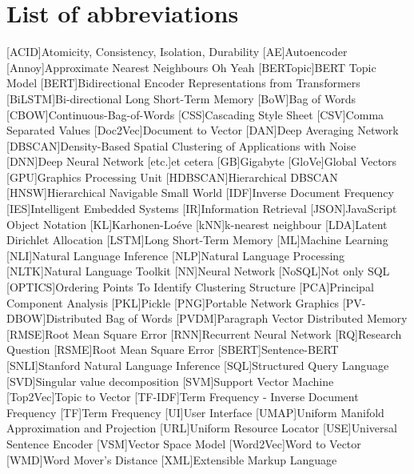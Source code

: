 \chapter*{List of abbreviations}

\begin{acronym}[XXXXXXXXX]
    [ACID]{Atomicity, Consistency, Isolation, Durability}
    [AE]{Autoencoder}
    [Annoy]{Approximate Nearest Neighbours Oh Yeah}
    [BERTopic]{BERT Topic Model}
    [BERT]{Bidirectional Encoder Representations from Transformers}
    [BiLSTM]{Bi-directional Long Short-Term Memory}
    [BoW]{Bag of Words}
    [CBOW]{Continuous-Bag-of-Words}
    [CSS]{Cascading Style Sheet}
    [CSV]{Comma Separated Values}
    [Doc2Vec]{Document to Vector}
    [DAN]{Deep Averaging Network}
    [DBSCAN]{Density-Based Spatial Clustering of Applications with Noise}
    [DNN]{Deep Neural Network}
    [etc.]{et cetera}    
    [GB]{Gigabyte}
    [GloVe]{Global Vectors}
    [GPU]{Graphics Processing Unit}
    [HDBSCAN]{Hierarchical DBSCAN}
    [HNSW]{Hierarchical Navigable Small World}
    [IDF]{Inverse Document Frequency}
    [IES]{Intelligent Embedded Systems}
    [IR]{Information Retrieval}
    [JSON]{JavaScript Object Notation}
    [KL]{Karhonen-Loéve}
    [kNN]{k-nearest neighbour}
    [LDA]{Latent Dirichlet Allocation}
    [LSTM]{Long Short-Term Memory}
    [ML]{Machine Learning}
    [NLI]{Natural Language Inference}
    [NLP]{Natural Language Processing}
    [NLTK]{Natural Language Toolkit}
    [NN]{Neural Network}
    [NoSQL]{Not only SQL}
    [OPTICS]{Ordering Points To Identify Clustering Structure}
    [PCA]{Principal Component Analysis}
    [PKL]{Pickle}
    [PNG]{Portable Network Graphics}
    [PV-DBOW]{Distributed Bag of Words}
    [PVDM]{Paragraph Vector Distributed Memory}
    [RMSE]{Root Mean Square Error}
    [RNN]{Recurrent Neural Network}
    [RQ]{Research Question}
    [RSME]{Root Mean Square Error}
    [SBERT]{Sentence-BERT}
    [SNLI]{Stanford Natural Language Inference}
    [SQL]{Structured Query Language}
    [SVD]{Singular value decomposition}
    [SVM]{Support Vector Machine}
    [Top2Vec]{Topic to Vector}
    [TF-IDF]{Term Frequency - Inverse Document Frequency}
    [TF]{Term Frequency}
    [UI]{User Interface}
    [UMAP]{Uniform Manifold Approximation and Projection}
    [URL]{Uniform Resource Locator}
    [USE]{Universal Sentence Encoder}
    [VSM]{Vector Space Model}
    [Word2Vec]{Word to Vector}
    [WMD]{Word Mover's Distance}
    [XML]{Extensible Markup Language}
\end{acronym}
